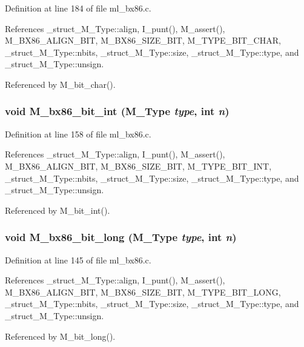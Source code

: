 Definition at line 184 of file ml\_\-bx86.c.

References \_\-struct\_\-M\_\-Type::align, I\_\-punt(), M\_\-assert(), M\_\-BX86\_\-ALIGN\_\-BIT, M\_\-BX86\_\-SIZE\_\-BIT, M\_\-TYPE\_\-BIT\_\-CHAR, \_\-struct\_\-M\_\-Type::nbits, \_\-struct\_\-M\_\-Type::size, \_\-struct\_\-M\_\-Type::type, and \_\-struct\_\-M\_\-Type::unsign.

Referenced by M\_\-bit\_\-char().
\subsubsection{\setlength{\rightskip}{0pt plus 5cm}void M\_\-bx86\_\-bit\_\-int (\bf{M\_\-Type} {\em type}, int {\em n})}\label{m__bx86_8h_220e0e699bca85da464e4279dc2fcaa9}




Definition at line 158 of file ml\_\-bx86.c.

References \_\-struct\_\-M\_\-Type::align, I\_\-punt(), M\_\-assert(), M\_\-BX86\_\-ALIGN\_\-BIT, M\_\-BX86\_\-SIZE\_\-BIT, M\_\-TYPE\_\-BIT\_\-INT, \_\-struct\_\-M\_\-Type::nbits, \_\-struct\_\-M\_\-Type::size, \_\-struct\_\-M\_\-Type::type, and \_\-struct\_\-M\_\-Type::unsign.

Referenced by M\_\-bit\_\-int().
\subsubsection{\setlength{\rightskip}{0pt plus 5cm}void M\_\-bx86\_\-bit\_\-long (\bf{M\_\-Type} {\em type}, int {\em n})}\label{m__bx86_8h_1a24ff2c44e9442e23c4aeb67e4d09f8}




Definition at line 145 of file ml\_\-bx86.c.

References \_\-struct\_\-M\_\-Type::align, I\_\-punt(), M\_\-assert(), M\_\-BX86\_\-ALIGN\_\-BIT, M\_\-BX86\_\-SIZE\_\-BIT, M\_\-TYPE\_\-BIT\_\-LONG, \_\-struct\_\-M\_\-Type::nbits, \_\-struct\_\-M\_\-Type::size, \_\-struct\_\-M\_\-Type::type, and \_\-struct\_\-M\_\-Type::unsign.

Referenced by M\_\-bit\_\-long().

